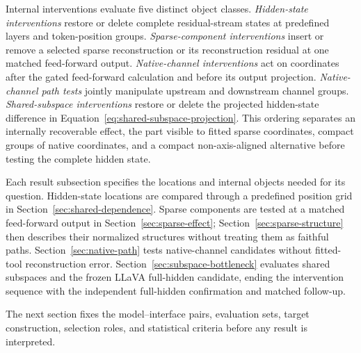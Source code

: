 Internal interventions evaluate five distinct object classes. \emph{Hidden-state interventions} restore or delete complete residual-stream states at predefined layers and token-position groups. \emph{Sparse-component interventions} insert or remove a selected sparse reconstruction or its reconstruction residual at one matched feed-forward output. \emph{Native-channel interventions} act on coordinates after the gated feed-forward calculation and before its output projection. \emph{Native-channel path tests} jointly manipulate upstream and downstream channel groups. \emph{Shared-subspace interventions} restore or delete the projected hidden-state difference in Equation~\ref{eq:shared-subspace-projection}. This ordering separates an internally recoverable effect, the part visible to fitted sparse coordinates, compact groups of native coordinates, and a compact non-axis-aligned alternative before testing the complete hidden state.

Each result subsection specifies the locations and internal objects needed for its question. Hidden-state locations are compared through a predefined position grid in Section~\ref{sec:shared-dependence}. Sparse components are tested at a matched feed-forward output in Section~\ref{sec:sparse-effect}; Section~\ref{sec:sparse-structure} then describes their normalized structures without treating them as faithful paths. Section~\ref{sec:native-path} tests native-channel candidates without fitted-tool reconstruction error. Section~\ref{sec:subspace-bottleneck} evaluates shared subspaces and the frozen LLaVA full-hidden candidate, ending the intervention sequence with the independent full-hidden confirmation and matched follow-up.

The next section fixes the model--interface pairs, evaluation sets, target construction, selection roles, and statistical criteria before any result is interpreted.
